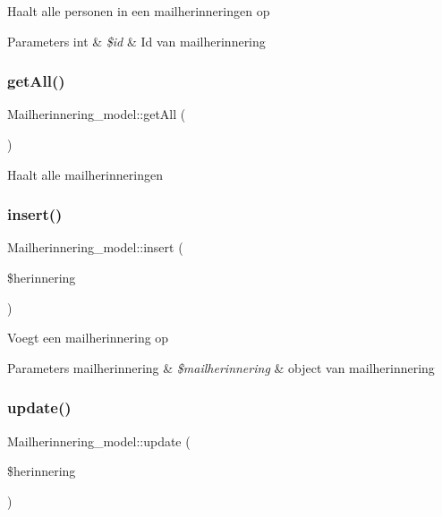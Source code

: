 Haalt alle personen in een mailherinneringen op 
\begin{DoxyParams}[1]{Parameters}
int & {\em \$id} & Id van mailherinnering \\
\hline
\end{DoxyParams}
\mbox{\label{class_mailherinnering__model_a52d132c8b5bed589d41796c2bccaeea0}} 
\subsubsection{\texorpdfstring{get\+All()}{getAll()}}
{\footnotesize\ttfamily Mailherinnering\+\_\+model\+::get\+All (\begin{DoxyParamCaption}{ }\end{DoxyParamCaption})}

Haalt alle mailherinneringen \mbox{\label{class_mailherinnering__model_a1e936efd2fa8e6e311a0289dacec6243}} 
\subsubsection{\texorpdfstring{insert()}{insert()}}
{\footnotesize\ttfamily Mailherinnering\+\_\+model\+::insert (\begin{DoxyParamCaption}\item[{}]{\$herinnering }\end{DoxyParamCaption})}

Voegt een mailherinnering op 
\begin{DoxyParams}[1]{Parameters}
mailherinnering & {\em \$mailherinnering} & object van mailherinnering \\
\hline
\end{DoxyParams}
\mbox{\label{class_mailherinnering__model_abcd691276b2a166a51c20bd1507acf9e}} 
\subsubsection{\texorpdfstring{update()}{update()}}
{\footnotesize\ttfamily Mailherinnering\+\_\+model\+::update (\begin{DoxyParamCaption}\item[{}]{\$herinnering }\end{DoxyParamCaption})}

